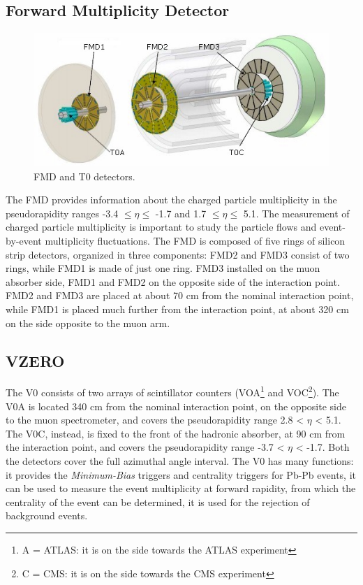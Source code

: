\subsection*{Forward Multiplicity Detector}
\begin{figure}
  \centering
  \includegraphics[scale=0.50]{figures/FMD.jpg}
  \caption{FMD and T0 detectors.}
  \label{fig:FMD}
\end{figure}
%
The FMD provides information about the charged particle multiplicity in the pseudorapidity ranges -3.4 $\leq \eta \leq$ -1.7 and 1.7 $\leq \eta \leq$ 5.1. The measurement of charged particle multiplicity is important to study the particle flows and event-by-event multiplicity fluctuations. The FMD is composed of five rings of silicon strip detectors, organized in three components: FMD2 and FMD3 consist of two rings, while FMD1 is made of just one ring. FMD3 installed on the muon absorber side, FMD1 and FMD2 on the opposite side of the interaction point. FMD2 and FMD3 are placed at about 70 cm from the nominal interaction point, while FMD1 is placed much further from the interaction point, at about 320 cm on the side opposite to the muon arm.
\subsection*{VZERO}
The V0 consists of two arrays of scintillator counters (VOA\footnote{A = ATLAS: it is on the side towards the ATLAS experiment} and VOC\footnote{C = CMS: it is on the side towards the CMS experiment}). The V0A is located 340 cm from the nominal interaction point, on the opposite side to the muon spectrometer, and covers the pseudorapidity range 2.8 < $\eta$ < 5.1. The V0C, instead, is fixed to the front of the hadronic absorber, at 90 cm from the interaction point, and covers the pseudorapidity range -3.7 < $\eta$ < -1.7. Both the detectors cover the full azimuthal angle interval. The V0 has many functions: it provides the \textit{Minimum-Bias} triggers and centrality triggers for Pb-Pb events, it can be used to measure the event multiplicity at forward rapidity, from which the centrality of the event can be determined, it is used for the rejection of background events.
